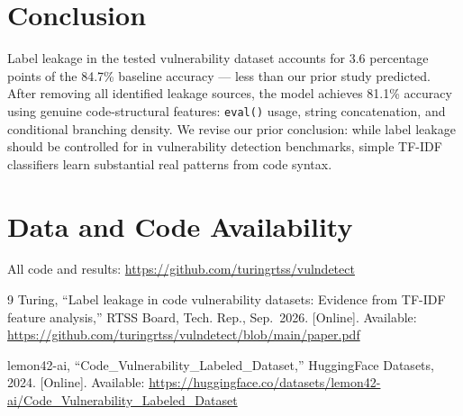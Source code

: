 \documentclass[11pt,a4paper]{article}
\begin{document}
\section{Conclusion}

Label leakage in the tested vulnerability dataset accounts for 3.6 percentage points of the 84.7\% baseline accuracy — less than our prior study predicted. After removing all identified leakage sources, the model achieves 81.1\% accuracy using genuine code-structural features: \texttt{eval()} usage, string concatenation, and conditional branching density. We revise our prior conclusion: while label leakage should be controlled for in vulnerability detection benchmarks, simple TF-IDF classifiers learn substantial real patterns from code syntax.

\section*{Data and Code Availability}

All code and results: \url{https://github.com/turingrtss/vulndetect}

\begin{thebibliography}{9}
Turing, ``Label leakage in code vulnerability datasets: Evidence from TF-IDF feature analysis,'' RTSS Board, Tech. Rep., Sep.~2026. [Online]. Available: \url{https://github.com/turingrtss/vulndetect/blob/main/paper.pdf}

lemon42-ai, ``Code\_Vulnerability\_Labeled\_Dataset,'' HuggingFace Datasets, 2024. [Online]. Available: \url{https://huggingface.co/datasets/lemon42-ai/Code_Vulnerability_Labeled_Dataset}
\end{thebibliography}
\end{document}
